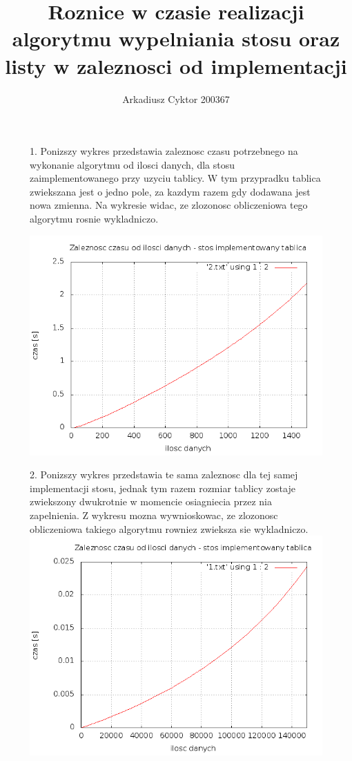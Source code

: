 \documentclass[a4paper,11pt]{report}
\title{Roznice w czasie realizacji algorytmu wypelniania stosu oraz listy w zaleznosci od implementacji}
\author{Arkadiusz Cyktor 200367}
\begin{document}
\maketitle

\begin{figure}
  1. Ponizszy wykres przedstawia zaleznosc czasu potrzebnego na wykonanie algorytmu od ilosci danych, dla stosu zaimplementowanego przy uzyciu tablicy. W tym przypradku tablica zwiekszana jest o jedno pole, za kazdym razem gdy dodawana jest nowa zmienna. Na wykresie widac, ze zlozonosc obliczeniowa tego algorytmu rosnie wykladniczo.
  
    \includegraphics[scale=0.5]{./stos_tablica_o2.png}
\end{figure}

\begin{figure}
  2. Ponizszy wykres przedstawia te sama zaleznosc dla tej samej implementacji stosu, jednak tym razem rozmiar tablicy zostaje zwiekszony dwukrotnie w momencie osiagniecia przez nia zapelnienia. Z wykresu mozna wywnioskowac, ze zlozonosc obliczeniowa takiego algorytmu rowniez zwieksza sie wykladniczo.
    \includegraphics[scale=0.5]{./stos_tablica_o1.png}
\end{figure}
\end{document}
